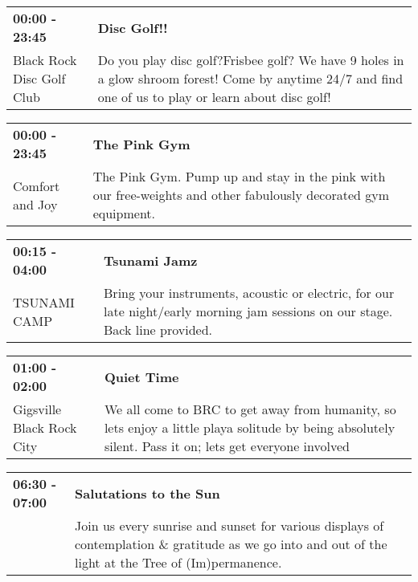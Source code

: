 \begin{tabular}{ p{1in} p{2.2in} }
    \textbf{00:00 - 23:45} & \textbf{Disc Golf!!} \\
    Black Rock Disc Golf Club \newline  & Do you play disc golf?Frisbee golf? We have 9 holes in a glow shroom forest! Come by anytime 24/7 and find one of us to play or learn about disc golf! \\
    \hline 
\end{tabular}
    
\begin{tabular}{ p{1in} p{2.2in} }
    \textbf{00:00 - 23:45} & \textbf{The Pink Gym} \\
    Comfort and Joy \newline  & The Pink Gym.  Pump up and stay in the pink with our free-weights and other fabulously decorated gym equipment. \\
    \hline 
\end{tabular}
    
\begin{tabular}{ p{1in} p{2.2in} }
    \textbf{00:15 - 04:00} & \textbf{Tsunami Jamz} \\
    TSUNAMI CAMP \newline  & Bring your instruments, acoustic or electric, for our late night/early morning jam sessions on our stage.  Back line provided. \\
    \hline 
\end{tabular}
    
\begin{tabular}{ p{1in} p{2.2in} }
    \textbf{01:00 - 02:00} & \textbf{Quiet Time} \\
    Gigsville \newline Black Rock City & We all come to BRC to get away from humanity, so lets enjoy a little playa solitude by being absolutely silent. Pass it on; lets get everyone involved \\
    \hline 
\end{tabular}
    
\begin{tabular}{ p{1in} p{2.2in} }
    \textbf{06:30 - 07:00} & \textbf{Salutations to the Sun} \\
    ~ \newline  & Join us every sunrise and sunset for various displays of contemplation \& gratitude as we go into and out of the light at the Tree of (Im)permanence. \\
    \hline 
\end{tabular}
    
